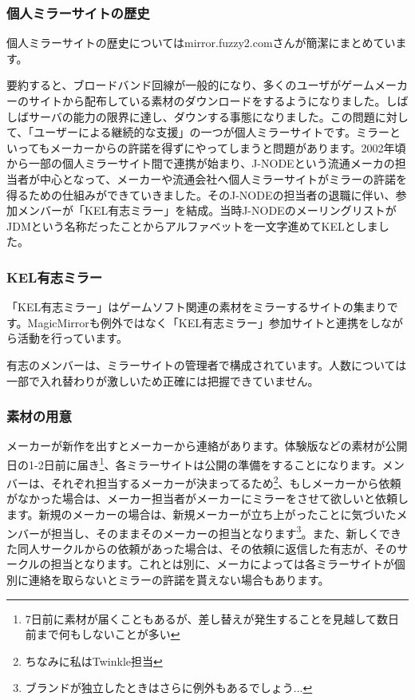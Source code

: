 \subsubsection{個人ミラーサイトの歴史}
個人ミラーサイトの歴史についてはmirror.fuzzy2.comさんが簡潔にまとめています。\cite{fuzzy2_1}

要約すると、ブロードバンド回線が一般的になり、多くのユーザがゲームメーカーのサイトから配布している素材のダウンロードをするようになりました。しばしばサーバの能力の限界に達し、ダウンする事態になりました。この問題に対して、「ユーザーによる継続的な支援」の一つが個人ミラーサイトです。ミラーといってもメーカーからの許諾を得ずにやってしまうと問題があります。2002年頃から一部の個人ミラーサイト間で連携が始まり、J-NODEという流通メーカの担当者が中心となって、メーカーや流通会社へ個人ミラーサイトがミラーの許諾を得るための仕組みができていきました。そのJ-NODEの担当者の退職に伴い、参加メンバーが「KEL有志ミラー」を結成。当時J-NODEのメーリングリストがJDMという名称だったことからアルファベットを一文字進めてKELとしました。\cite{XES}


\subsubsection{KEL有志ミラー}

「KEL有志ミラー」はゲームソフト関連の素材をミラーするサイトの集まりです。MagicMirrorも例外ではなく「KEL有志ミラー」参加サイトと連携をしながら活動を行っています。

有志のメンバーは、ミラーサイトの管理者で構成されています。人数については一部で入れ替わりが激しいため正確には把握できていません。

\subsubsection{素材の用意}

メーカーが新作を出すとメーカーから連絡があります。体験版などの素材が公開日の1-2日前に届き\footnote{7日前に素材が届くこともあるが、差し替えが発生することを見越して数日前まで何もしないことが多い}、各ミラーサイトは公開の準備をすることになります。メンバーは、それぞれ担当するメーカーが決まってるため\footnote{ちなみに私はTwinkle担当}、もしメーカーから依頼がなかった場合は、メーカー担当者がメーカーにミラーをさせて欲しいと依頼します。新規のメーカーの場合は、新規メーカーが立ち上がったことに気づいたメンバーが担当し、そのままそのメーカーの担当となります\footnote{ブランドが独立したときはさらに例外もあるでしょう...}。また、新しくできた同人サークルからの依頼があった場合は、その依頼に返信した有志が、そのサークルの担当となります。これとは別に、メーカによっては各ミラーサイトが個別に連絡を取らないとミラーの許諾を貰えない場合もあります。

